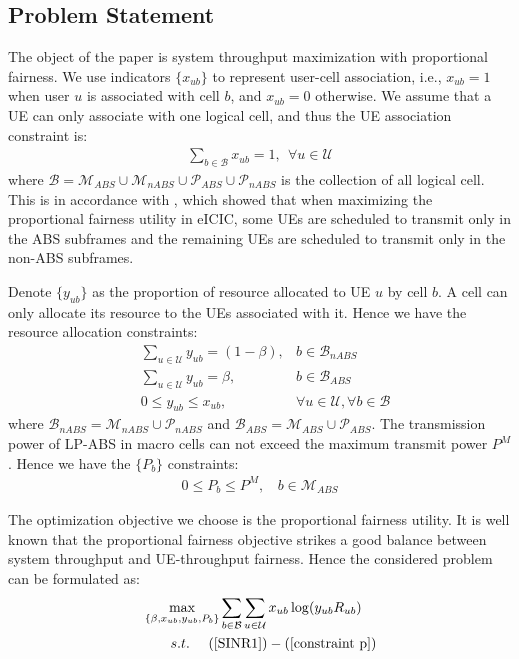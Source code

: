 \documentclass[journal]{IEEETran}
\begin{document}
\subsection{Problem Statement}\label{Problem Statement}
The object of the paper is system throughput maximization with proportional fairness. We use indicators $\{x_{ub}\}$ to represent user-cell association, i.e., $x_{ub} = 1$ when user $u$ is associated with cell $b$, and $x_{ub} = 0$ otherwise. We assume that a UE can only associate with one logical cell, and thus the UE association constraint is:
\begin{align}
\sum_{b \in \mathcal{B}}x_{ub} = 1,~~ \forall u \in \mathcal{U}
\end{align}
where $\mathcal{B} = \mathcal{M}_{ABS} \cup \mathcal{M}_{nABS} \cup \mathcal{P}_{ABS} \cup \mathcal{P}_{nABS}$ is the collection of all logical cell. This is in accordance with \cite{OptimalMutingAndLoad}, which showed that when maximizing the proportional fairness utility in eICIC, some UEs are scheduled to transmit only in the ABS subframes and the remaining UEs are scheduled to transmit only in the non-ABS subframes. 

Denote $\{y_{ub}\}$ as the proportion of resource allocated to UE $u$ by cell $b$. A cell can only allocate its resource to the UEs associated with it. Hence we have the resource allocation constraints:
\begin{subequations}
\begin{align}
&\sum_{u \in \mathcal{U}}y_{ub} = (1 - \beta),& b \in \mathcal{B}_{nABS}\\
&\sum_{u \in \mathcal{U}}y_{ub} = \beta,& b \in \mathcal{B}_{ABS}\\
&0 \leq y_{ub} \leq x_{ub}, &\forall u \in \mathcal{U}, \forall b \in \mathcal{B}
\end{align}
\end{subequations}
where $\mathcal{B}_{nABS} = \mathcal{M}_{nABS} \cup \mathcal{P}_{nABS}$ and $\mathcal{B}_{ABS} = \mathcal{M}_{ABS} \cup \mathcal{P}_{ABS}$. The transmission power of LP-ABS in macro cells can not exceed the maximum transmit power $P^M$. Hence we have the $\{P_b\}$ constraints:
\begin{align}\label{constraint p}
0 \leq P_b \leq P^M,~~~~b \in \mathcal{M}_{ABS}
\end{align}

The optimization objective we choose is the proportional fairness utility. It is well known that the proportional fairness objective strikes a good balance between system throughput and UE-throughput fairness\cite{JainFairness}. Hence the considered problem can be formulated as:
\begin{align}\label{optimization obj}
&\max_{\{\beta,x_{ub},y_{ub},P_b\}} \sum_{b \in \mathcal{B}} \sum_{u \in \mathcal{U}} x_{ub} \log (y_{ub}R_{ub})\\
&~~~~~~s.t.~~~~(\ref{SINR1}) - (\ref{constraint p}) \notag
\end{align}
\end{document}
